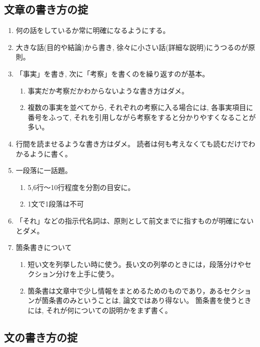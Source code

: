 \documentclass[12pt, ]{jsarticle}
\providecommand{\tightlist}{%
   \setlength{\itemsep}{0pt}\setlength{\parskip}{0pt}}
\begin{document}
\hypertarget{ux6587ux7ae0ux306eux66f8ux304dux65b9ux306eux639f}{%
\subsection{文章の書き方の掟}\label{ux6587ux7ae0ux306eux66f8ux304dux65b9ux306eux639f}}

\begin{enumerate}
\tightlist
\item
  何の話をしているか常に明確になるようにする。
\item
  大きな話(目的や結論)から書き,
  徐々に小さい話(詳細な説明)にうつるのが原則。
\item
  「事実」を書き, 次に「考察」を書くのを繰り返すのが基本。

  \begin{enumerate}
  \tightlist
  \item
    事実だか考察だかわからないような書き方はダメ。
  \item
    複数の事実を並べてから, それぞれの考察に入る場合には,
    各事実項目に番号をふって,
    それを引用しながら考察をすると分かりやすくなることが多い。
  \end{enumerate}
\item
  行間を読ませるような書き方はダメ。
  読者は何も考えなくても読むだけでわかるように書く。
\item
  一段落に一話題。

  \begin{enumerate}
  \tightlist
  \item
    5,6行〜10行程度を分割の目安に。
  \item
    1文で1段落は不可
  \end{enumerate}
\item
  「それ」などの指示代名詞は、原則として前文までに指すものが明確にないとダメ。
\item
  箇条書きについて

  \begin{enumerate}
  \tightlist
  \item
    短い文を列挙したい時に使う。長い文の列挙のときには，段落分けやセクション分けを上手に使う。
  \item
    箇条書は文章中で少し情報をまとめるためのものであり，あるセクションが箇条書のみということは,
    論文ではあり得ない。 箇条書を使うときには,
    それが何についての説明かをまず書く。
  \end{enumerate}
\end{enumerate}

\hypertarget{ux6587ux306eux66f8ux304dux65b9ux306eux639f}{%
\subsection{文の書き方の掟}\label{ux6587ux306eux66f8ux304dux65b9ux306eux639f}}
\end{document}
